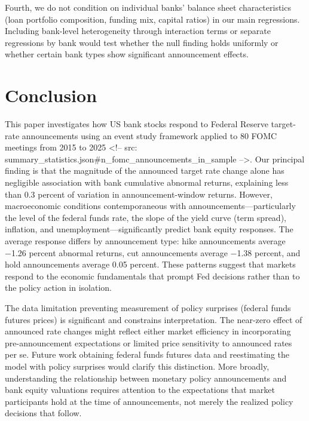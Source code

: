 \documentclass{article}
\begin{document}
Fourth, we do not condition on individual banks' balance sheet characteristics (loan portfolio composition, funding mix, capital ratios) in our main regressions. Including bank-level heterogeneity through interaction terms or separate regressions by bank would test whether the null finding holds uniformly or whether certain bank types show significant announcement effects.

\section{Conclusion}

This paper investigates how US bank stocks respond to Federal Reserve target-rate announcements using an event study framework applied to 80 FOMC meetings from 2015 to 2025 <!-- src: summary_statistics.json#n_fomc_announcements_in_sample -->. Our principal finding is that the magnitude of the announced target rate change alone has negligible association with bank cumulative abnormal returns, explaining less than 0.3 percent of variation in announcement-window returns. However, macroeconomic conditions contemporaneous with announcements—particularly the level of the federal funds rate, the slope of the yield curve (term spread), inflation, and unemployment—significantly predict bank equity responses. The average response differs by announcement type: hike announcements average −1.26 percent abnormal returns, cut announcements average −1.38 percent, and hold announcements average 0.05 percent. These patterns suggest that markets respond to the economic fundamentals that prompt Fed decisions rather than to the policy action in isolation.

The data limitation preventing measurement of policy surprises (federal funds futures prices) is significant and constrains interpretation. The near-zero effect of announced rate changes might reflect either market efficiency in incorporating pre-announcement expectations or limited price sensitivity to announced rates per se. Future work obtaining federal funds futures data and reestimating the model with policy surprises would clarify this distinction. More broadly, understanding the relationship between monetary policy announcements and bank equity valuations requires attention to the expectations that market participants hold at the time of announcements, not merely the realized policy decisions that follow.
\end{document}
